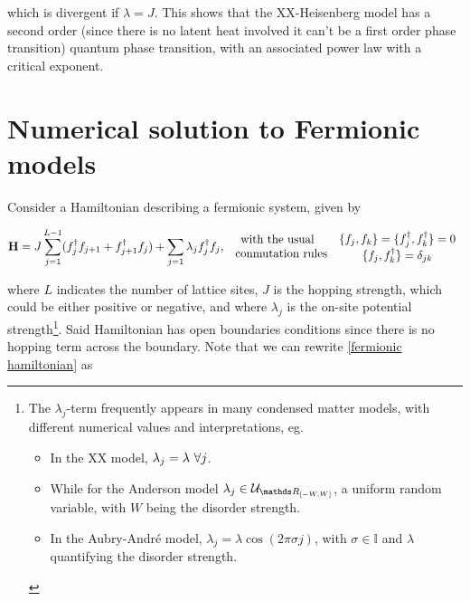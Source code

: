 \documentclass{homework}
\begin{document}
which is divergent if $\lambda = J$. This shows that the XX-Heisenberg model has a second order (since there is no latent heat involved it can't be a first order phase transition) quantum phase transition, with an associated power law with a critical exponent.  \\

\section{Numerical solution to Fermionic models}

Consider a Hamiltonian describing a fermionic system, given by 

\begin{equation}
    {\bf H} = J \sum_{j=1}^{L-1} (f_{j}^{\dagger}f_{j+1} + f_{j+1}^{\dagger}f_{j}) + \sum_{j=1} \lambda_j f_{j}^{\dagger} f_j, \begin{array}{c}
         \textnormal{with the usual } \\
         \textnormal{ conmutation rules} 
    \end{array}
    \begin{array}{c}
         \{f_j, f_k\} = \{f_j^\dagger, f_k^\dagger\} = 0  \\
         \{f_j, f_k^\dagger\} = \delta_{jk}
    \end{array}
    \label{fermionic hamiltonian}
\end{equation}

where $L$ indicates the number of lattice sites, $J$ is the hopping strength, which could be either positive or negative, and where $\lambda_j$ is the on-site potential strength\footnote{The $\lambda_j$-term frequently appears in many condensed matter models, with different numerical values and interpretations, eg.

\begin{itemize}
    \item In the XX model, $\lambda_j = \lambda \textnormal{ } \forall j$. 
    \item While for the Anderson model $\lambda_j \in \mathcal{U}_{\R_{[-W, W]}}$, a uniform random variable, with $W$ being the disorder strength. 
    \item In the Aubry-André model, $\lambda_j = \lambda \cos(2\pi\sigma j)$, with $\sigma \in \mathds{I}$ and $\lambda$ quantifying the disorder strength. 
\end{itemize}}. Said Hamiltonian has open boundaries conditions since there is no hopping term across the boundary. Note that we can rewrite \eqref{fermionic hamiltonian} as 
\end{document}

